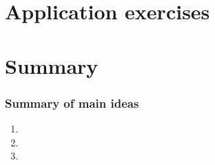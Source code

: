 \documentclass[slidestop,compress,mathserif,12pt,t,professionalfonts,xcolor=table]{beamer}
\begin{document}

\section{Application exercises}


\begin{frame}

\vfill


\vfill

\end{frame}


\section{Summary}


\begin{frame}
\frametitle{Summary of main ideas}

\vfill

\begin{enumerate}

\item {}

\item {}

\item {}

\end{enumerate}

\vfill

\end{frame}

\end{document}
